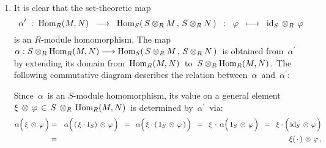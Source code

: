 \begin{enumerate}
\item
	It is clear that the set-theoretic map
	\begin{equation*}
	\alpha^{\prime} \;:\; \textnormal{Hom}_{R}(M,N)
		\;\; \longrightarrow \;\;
		\textnormal{Hom}_{S}\!\left(\, S \otimes_{R} M \,,\, S \otimes_{R} N \,\right)
	\;\;:\;\;
		\varphi \;\; \longmapsto \;\; \textnormal{id}_{S} \,\otimes_{R}\, \varphi
	\end{equation*}
	is an $R$-module homomorphism.
	The map
	\,$\alpha : S \otimes_{R} \textnormal{Hom}_{R}(M,N) \longrightarrow \textnormal{Hom}_{S}\!\left(\,S\otimes_{R}M\,,\,S\otimes_{R}N\,\right)$\,
	is obtained from \,$\alpha^{\prime}$\, by extending its domain from
	\,$\textnormal{Hom}_{R}(M,N)$\, to \,$S \otimes_{R} \textnormal{Hom}_{R}(M,N)$.\,
	The following commutative diagram describes the relation between \,$\alpha$\, and \,$\alpha^{\prime}$:\,
	\begin{center}
	\end{center}
	Since \,$\alpha$\, is an $S$-module homomorphism, its value on a general element
	\,$\xi \,\otimes\, \varphi \,\in\, S \,\otimes_{R}\, \textnormal{Hom}_{R}(M,N)$\,
	is determined by \,$\alpha^{\prime}$\, via:
	\begin{eqnarray*}
	\alpha\!\left(\, \xi \,\overset{{\color{white}.}}{\otimes}\, \varphi \,\right)
	& = &
		\alpha\!\left(\, (\,\xi \cdot 1_{S}) \,\overset{{\color{white}.}}{\otimes}\, \varphi \,\right)
	\;\; = \;\;
		\alpha\!\left(\, \xi \cdot (\,1_{S} \,\overset{{\color{white}.}}{\otimes}\, \varphi\,) \,\right)
	\;\; = \;\;
		\xi \,\cdot\, \alpha\!\left(\, 1_{S} \,\overset{{\color{white}.}}{\otimes}\, \varphi \,\right)
	\;\; = \;\;
		\xi \cdot \left(\, \id_{S} \,\overset{{\color{white}.}}{\otimes}\, \varphi \,\right)
	\\
	& = &
		\xi(\,\cdot\,) \,\overset{{\color{white}.}}{\otimes}\, \varphi\,,
	\end{eqnarray*}

\end{enumerate}
